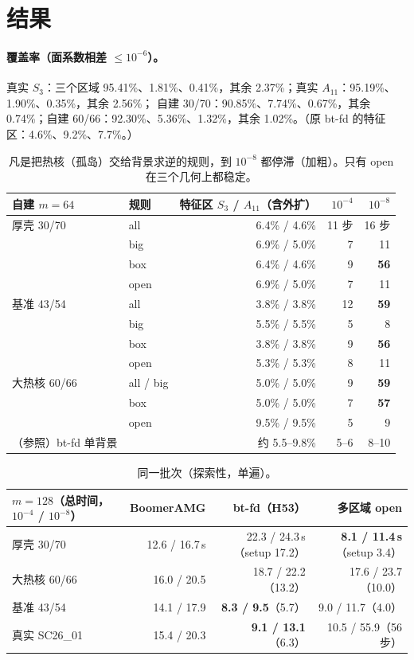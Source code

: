 \documentclass[11pt,a4paper]{ctexart}
\begin{document}
\section{结果}
\paragraph{覆盖率（面系数相差 $\le10^{-6}$）。}真实 $S_3$：三个区域 95.41\%、1.81\%、0.41\%，其余 2.37\%；真实 $A_{11}$：95.19\%、1.90\%、0.35\%，其余 2.56\%；
自建 30/70：90.85\%、7.74\%、0.67\%，其余 0.74\%；自建 60/66：92.30\%、5.36\%、1.32\%，其余 1.02\%。（原 bt-fd 的特征区：4.6\%、9.2\%、7.7\%。）

\begin{table}[H]
\centering\footnotesize
\begin{tabular}{llrrr}
\toprule
自建 $m=64$ & 规则 & 特征区 $S_3$ / $A_{11}$（含外扩） & $10^{-4}$ & $10^{-8}$ \\
\midrule
厚壳 30/70 & all & 6.4\% / 4.6\% & 11 步 & 16 步 \\
 & big & 6.9\% / 5.0\% & 7 & 11 \\
 & box & 6.4\% / 4.6\% & 9 & \textbf{56} \\
 & open & 6.9\% / 5.0\% & 7 & 11 \\
基准 43/54 & all & 3.8\% / 3.8\% & 12 & \textbf{59} \\
 & big & 5.5\% / 5.5\% & 5 & 8 \\
 & box & 3.8\% / 3.8\% & 9 & \textbf{56} \\
 & open & 5.3\% / 5.3\% & 8 & 11 \\
大热核 60/66 & all / big & 5.0\% / 5.0\% & 9 & \textbf{59} \\
 & box & 5.0\% / 5.0\% & 7 & \textbf{57} \\
 & open & 9.5\% / 9.5\% & 5 & 9 \\
\midrule
（参照）bt-fd 单背景 & & 约 5.5--9.8\% & 5--6 & 8--10 \\
\bottomrule
\end{tabular}
\caption{凡是把热核（孤岛）交给背景求逆的规则，到 $10^{-8}$ 都停滞（加粗）。只有 open 在三个几何上都稳定。}
\end{table}

\begin{table}[H]
\centering\footnotesize
\begin{tabular}{lrrr}
\toprule
$m=128$（总时间，$10^{-4}$ / $10^{-8}$） & BoomerAMG & bt-fd（H53） & 多区域 open \\
\midrule
厚壳 30/70 & 12.6 / 16.7\,s & 22.3 / 24.3\,s（setup 17.2） & \textbf{8.1 / 11.4\,s}（setup 3.4） \\
大热核 60/66 & 16.0 / 20.5 & 18.7 / 22.2（13.2） & 17.6 / 23.7（10.0） \\
基准 43/54 & 14.1 / 17.9 & \textbf{8.3 / 9.5}（5.7） & 9.0 / 11.7（4.0） \\
真实 SC26\_01 & 15.4 / 20.3 & \textbf{9.1 / 13.1}（6.3） & 10.5 / 55.9（56 步） \\
\bottomrule
\end{tabular}
\caption{同一批次（探索性，单遍）。}
\end{table}
\end{document}

